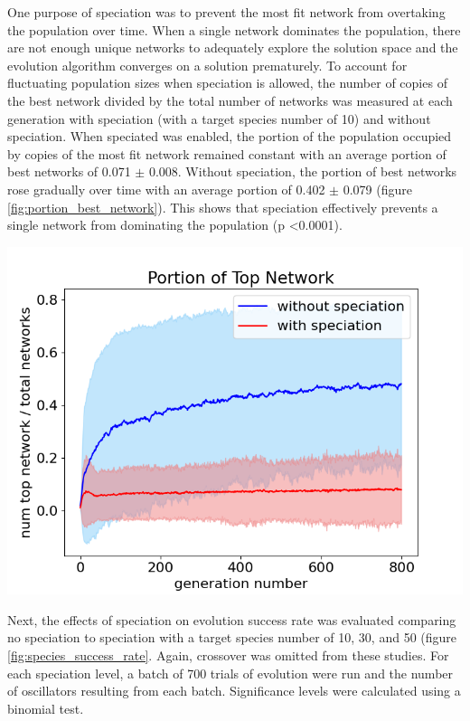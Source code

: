 \documentclass[12pt]{report}
\begin{document}
One purpose of speciation was to prevent the most fit network from overtaking the population over time. When a single network dominates the population, there are not enough unique networks to adequately explore the solution space and the evolution algorithm converges on a solution prematurely. To account for fluctuating population sizes when speciation is allowed, the number of copies of the best network divided by the total number of networks was measured at each generation with speciation (with a target species number of 10) and without speciation.  When speciated was enabled, the portion of the population occupied by copies of the most fit network
remained constant with an average portion of best networks of 0.071 $\pm$ 0.008. Without speciation, the portion of best networks rose gradually over time with an average portion of 0.402 $\pm$ 0.079 (figure \ref{fig:portion_best_network}). This shows that speciation effectively prevents a single network from dominating the population (p \textless 0.0001).

\begin{center}
    \includegraphics[width=18cm]{images/portion_best_network.png}
    \label{fig:portion_best_network}
\end{center}


Next, the effects of speciation on evolution success rate was evaluated comparing no speciation to speciation with a target species number of 10, 30, and 50 (figure \ref{fig:species_success_rate}. Again, crossover was omitted from these studies. For each speciation level, a batch of 700 trials of evolution were run and the number of oscillators resulting from each batch. Significance levels were calculated using a binomial test. 
\end{document}
